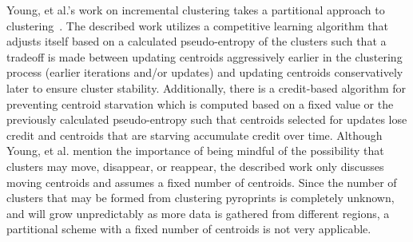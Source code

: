 \documentclass[12pt]{ucthesis}
\begin{document}
   Young, et al.'s work on incremental clustering takes a 
   partitional approach to clustering~\cite{Young:Incremental}. The described
   work utilizes a competitive learning algorithm that adjusts itself based on
   a calculated pseudo-entropy of the clusters such that a
   tradeoff is made between updating centroids aggressively earlier in the
   clustering process (earlier iterations and/or updates)
   and updating centroids conservatively later to ensure cluster stability.
   Additionally, there is a credit-based algorithm for preventing centroid
   starvation which is computed based on a fixed value or the previously
   calculated pseudo-entropy such that centroids selected for updates lose
   credit and centroids that are starving accumulate credit over time. Although
   Young, et al. mention the importance of being mindful of the possibility
   that clusters may move, disappear, or reappear, the described work only
   discusses moving centroids and assumes a fixed number of centroids. Since
   the number of clusters that may be formed from clustering pyroprints is
   completely unknown, and will grow unpredictably as more data is gathered
   from different regions, a partitional scheme with a fixed number of
   centroids is not very applicable.
\end{document}
